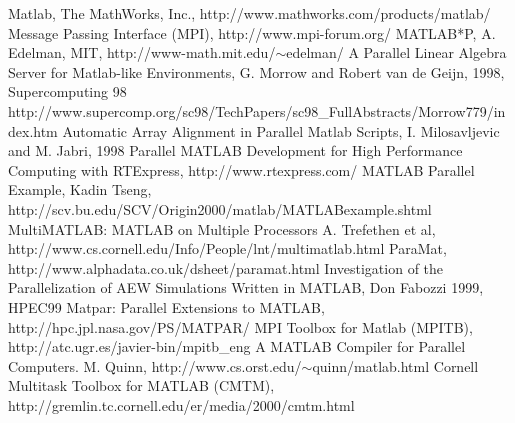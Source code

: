 \documentclass[11pt]{article}
\begin{document}
\begin{thebibliography}{99}

 Matlab, The MathWorks, Inc.,
    http://www.mathworks.com/products/matlab/
 Message Passing Interface (MPI),
    http://www.mpi-forum.org/
 MATLAB*P, A. Edelman, MIT,
    http://www-math.mit.edu/$\sim$edelman/
 A Parallel Linear Algebra Server for Matlab-like Environments,
    G. Morrow and Robert van de Geijn, 1998, Supercomputing 98
    http://www.supercomp.org/sc98/TechPapers/sc98\_FullAbstracts/Morrow779/index.htm
 Automatic Array Alignment in Parallel Matlab Scripts,
    I. Milosavljevic and M. Jabri, 1998
 Parallel MATLAB Development for High Performance Computing with RTExpress,
    http://www.rtexpress.com/
 MATLAB Parallel Example,
    Kadin Tseng,
    http://scv.bu.edu/SCV/Origin2000/matlab/MATLABexample.shtml
 MultiMATLAB: MATLAB on Multiple Processors
    A. Trefethen et al,
    http://www.cs.cornell.edu/Info/People/lnt/multimatlab.html
 ParaMat,
    http://www.alphadata.co.uk/dsheet/paramat.html
 Investigation of the Parallelization of AEW Simulations Written
    in MATLAB, Don Fabozzi 1999, HPEC99
 Matpar: Parallel Extensions to MATLAB,
    http://hpc.jpl.nasa.gov/PS/MATPAR/
 MPI Toolbox for Matlab (MPITB),
    http://atc.ugr.es/javier-bin/mpitb\_eng
 A MATLAB Compiler for Parallel Computers.
    M. Quinn,
    http://www.cs.orst.edu/$\sim$quinn/matlab.html
 Cornell Multitask Toolbox for MATLAB (CMTM),
    http://gremlin.tc.cornell.edu/er/media/2000/cmtm.html

\end{thebibliography}
\end{document}
